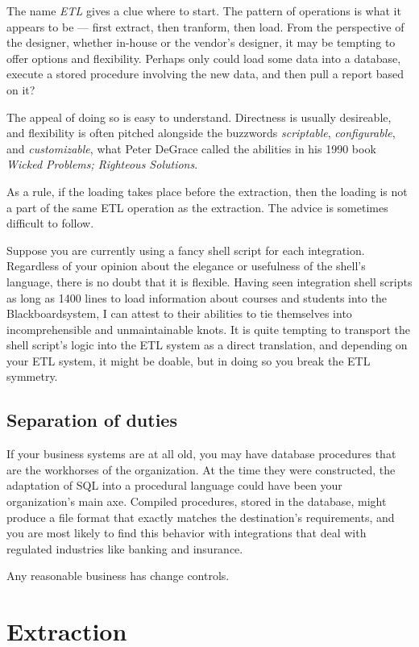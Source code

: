 \documentclass[11pt,letterpaper,twosided]{memoir}
\begin{document}
The name \emph{ETL} gives a clue where to start. The pattern of 
operations is what it appears to be --- first extract, then tranform,
then load. From the perspective of the designer, whether in-house or
the vendor's designer, it may be tempting to offer options and
flexibility. Perhaps only could load some data into a database,
execute a stored procedure involving the new data, and then pull 
a report based on it?

The appeal of doing so is easy to understand. Directness is usually
desireable, and flexibility is often pitched alongside the buzzwords
\emph{scriptable}, \emph{configurable}, and \emph{customizable}, 
what Peter DeGrace called the abilities in his 1990 book \emph{Wicked
Problems; Righteous Solutions}.

As a rule, if the loading takes place before the extraction, then the
loading is not a part of the same ETL operation as the extraction. 
The advice is sometimes difficult to follow. 

Suppose you are currently using a fancy shell script for each
integration. Regardless of your opinion about the elegance or
usefulness of the shell's language, there is no doubt that it is
flexible. Having seen integration shell scripts as long as 1400
lines to load information about courses and students into the
Blackboard\CircleR\thinspace system, I can attest to their abilities
to tie themselves into incomprehensible and unmaintainable knots.
It is quite tempting to transport the shell script's logic into the
ETL system as a direct translation, and depending on your ETL system,
it might be doable, but in doing so you break the ETL symmetry.

\subsection{Separation of duties}

If your business systems are at all old, you may have database
procedures that are the workhorses of the organization. At the time
they were constructed, the adaptation of SQL into a procedural language
could have been your organization's main axe. Compiled procedures,
stored in the database, might produce a file format that exactly 
matches the destination's requirements, and you are most likely to
find this behavior with integrations that deal with regulated 
industries like banking and insurance.

Any reasonable business has change controls. 

\section{Extraction}
\end{document}
